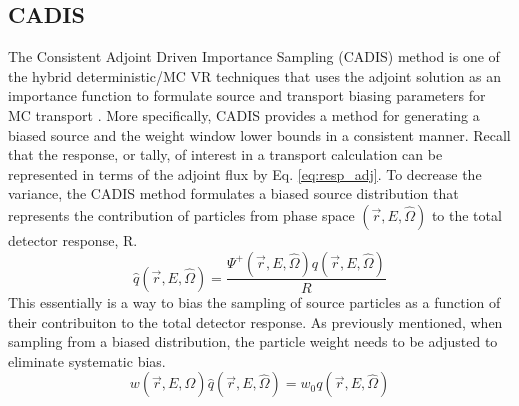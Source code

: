 \subsection{CADIS}
The Consistent Adjoint Driven Importance Sampling (CADIS) method is one of the
hybrid deterministic/MC VR
techniques that uses the adjoint solution as an importance function to 
formulate source and transport biasing parameters for MC transport \cite{cadis}.
More specifically, CADIS provides a method for generating
a biased source and the weight window lower bounds in a consistent manner.
Recall that the response, or tally, of interest in a transport calculation can be 
represented in terms of the adjoint flux by Eq. \ref{eq:resp_adj}.
To decrease the variance, the CADIS method formulates a biased
source distribution that represents the contribution of particles from phase space
$(\overrightarrow{r}, E, \widehat{\Omega})$ 
to the total detector response, R.
\begin{equation} \label{eq:3.8}
	\widehat{q}(\overrightarrow{r}, E, \widehat{\Omega}) =
	\frac{\Psi^{+}(\overrightarrow{r}, E,\widehat{\Omega})
	q(\overrightarrow{r}, E, \widehat{\Omega})}{R}
\end{equation}
This essentially is a way to bias the sampling of source particles as a function of their 
contribuiton to the total detector response.
As previously mentioned, when sampling from a biased distribution, the particle weight
needs to be adjusted to eliminate systematic bias.  
\begin{equation} \label{eq:3.9}
	w(\overrightarrow{r}, E,
	\widehat{\Omega})\widehat{q}(\overrightarrow{r}, E, \widehat{\Omega})=
	w_{0}q(\overrightarrow{r}, E, \widehat{\Omega})
\end{equation}
